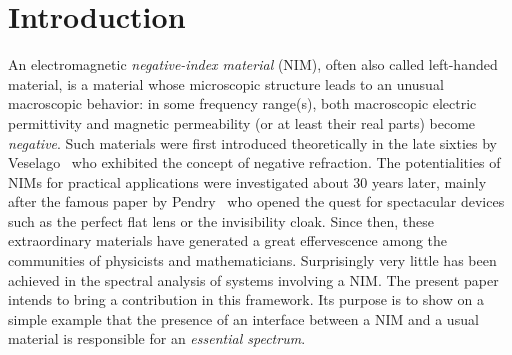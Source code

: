 \documentclass[11pt]{article}
\theoremstyle{definition}
\numberwithin{equation}{section}
\numberwithin{figure}{section}
\numberwithin{table}{section}
\begin{document}
\section{Introduction}\label{s-intro}
An electromagnetic \emph{negative-index material} (NIM), often also called left-handed material, is a material whose microscopic structure leads to an unusual macroscopic behavior: in some frequency range(s), both macroscopic electric permittivity and magnetic permeability (or at least their real parts) become \emph{negative}. Such materials were first introduced theoretically in the late sixties by Veselago~\cite{Ves-68} who exhibited the concept of negative refraction. The potentialities of NIMs for practical applications were investigated about 30 years later, mainly after the famous paper by Pendry~\cite{Pen-00} who opened the quest for spectacular devices such as the perfect flat lens or the invisibility cloak. Since then, these extraordinary materials have generated a great effervescence among the communities of physicists and mathematicians. Surprisingly very little has been achieved in the spectral analysis of systems involving a NIM. The present paper intends to bring a contribution in this framework. Its purpose is to show on a simple example that the presence of an interface between a NIM and a usual material is responsible for an \emph{essential spectrum}.
\end{document}

